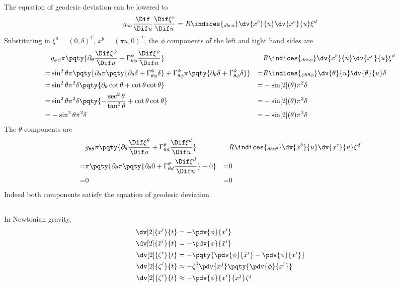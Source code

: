 \documentclass[12pt]{article}
\begin{document}
        \subsubsection{} The equation of geodesic deviation can be lowered to \[
            g_{ea}\frac{\Dif }{\Dif u} \frac{\Dif \xi^e}{\Dif u} = R\indices{_{dbca}} \dv{x^b}{u} \dv{x^c}{u} \xi^d
        \]
        Substituting in \(\xi^a = (0, \delta)^T\), \(x^b = (\pi u,0)^T\), the \(\phi\) components of the left and tight hand sides are \begin{align*}
            &g_{\phi\phi} \pi \pqty{\partial_\theta \frac{\Dif \xi^\phi}{\Dif u} +\Gamma^{\phi}_{\theta\phi} \frac{\Dif \xi^\phi}{\Dif u}} & & R\indices{_{dbc\phi}} \dv{x^b}{u} \dv{x^c}{u} \xi^d\\
            =&\sin^2\theta \pi \pqty{\partial_\theta \pi\pqty{ \partial_\theta \delta +\Gamma^{\phi}_{\theta\phi}\delta} +\Gamma^{\phi}_{\theta\phi} \pi\pqty{ \partial_\theta \delta +\Gamma^{\phi}_{\theta\phi}\delta}} &=&R\indices{_{\phi \theta\theta\phi}} \dv{\theta}{u} \dv{\theta}{u} \delta\\
            =&\sin^2\theta \pi^2 \delta\pqty{\partial_\theta  \cot\theta + \cot\theta \cot\theta} &=&-\sin[2](\theta) \pi^2 \delta\\
            =&\sin^2\theta \pi^2 \delta\pqty{ - \frac{\sec^2\theta}{\tan^2\theta} + \cot\theta \cot\theta} &=&-\sin[2](\theta) \pi^2 \delta\\
            =&-\sin^2\theta \pi^2 \delta &=&-\sin[2](\theta) \pi^2 \delta
        \end{align*} 
        The \(\theta\) components are \begin{align*}
            &g_{\theta\theta} \pi \pqty{\partial_\theta \frac{\Dif \xi^\theta}{\Dif u} +\Gamma^{\theta}_{\theta d} \frac{\Dif \xi^d}{\Dif u}} & & R\indices{_{dbc\theta}} \dv{x^b}{u} \dv{x^c}{u} \xi^d\\
            =& \pi \pqty{\partial_\theta \pi \pqty{\partial_\theta 0 +\Gamma^{\theta}_{\theta d} \frac{\Dif \xi^d}{\Dif u}} + 0} & =& 0\\
            =&0 & =& 0
        \end{align*}
        Indeed both components satisfy the equation of geodesic deviation.
        \subsection{} \subsubsection{} In Newtonian gravity,
        \begin{align*}
            \dv[2]{x^i}{t} &= - \pdv{\phi}{x^i}\\
            \dv[2]{\bar{x}^i}{t} &= - \pdv{\phi}{\bar{x}^i}\\
            \dv[2]{\zeta^i}{t} &= - \pqty{\pdv{\phi}{\bar{x}^i} - \pdv{\phi}{x^i}}\\
            \dv[2]{\zeta^i}{t} & \approx  - \zeta^j \pdv{x^j} \pqty{\pdv{\phi}{x^i}}\\
            \dv[2]{\zeta^i}{t} & \approx - \pdv{\phi}{x^i}{x^j} \zeta^j
        \end{align*}
\end{document}
